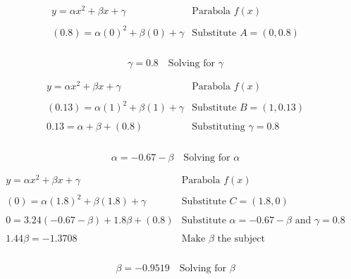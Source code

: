 \documentclass[12pt]{article}
\begin{document}
$$
\begin{array}{l|c}
    y = \alpha x^2 + \beta x + \gamma & \text{Parabola } f(x) \\ \\
    (0.8) = \alpha (0)^2 + \beta (0) + \gamma & \text{Substitute } A=(0,0.8) \\ \\
 \end{array}
$$

\begin{equation}\label{solve.gamma}
    \boxed{\gamma = 0.8}  \quad \text{Solving for } \gamma
\end{equation}
 
$$
\begin{array}{l|c}
    y = \alpha x^2 + \beta x + \gamma & \text{Parabola } f(x) \\ \\
    (0.13) = \alpha (1)^2 + \beta (1) + \gamma & \text{Substitute } B=(1,0.13) \\ \\
    0.13 = \alpha + \beta + (0.8) & \text{Substituting } \gamma=0.8 \\ \\
 \end{array} 
$$

\begin{equation}\label{solve.alpha}
    \boxed{ \alpha = -0.67 - \beta }  \quad \text{Solving for } \alpha
\end{equation}

$$
\begin{array}{l|c}
    y = \alpha x^2 + \beta x + \gamma & \text{Parabola } f(x) \\ \\
    (0) = \alpha (1.8)^2 + \beta (1.8) + \gamma & \text{Substitute } C=(1.8,0) \\ \\
    0 = 3.24(-0.67 -\beta) + 1.8 \beta + (0.8) & \text{Substitute } \alpha =-0.67- \beta \text{ and } \gamma =0.8\\ \\
    1.44 \beta = -1.3708 & \text{Make } \beta \text{ the subject} \\ \\
\end{array}
$$

\begin{equation}\label{solve.beta}
    \boxed{ \beta = -0.9519}  \quad \text{Solving for } \beta
\end{equation}
\end{document}
